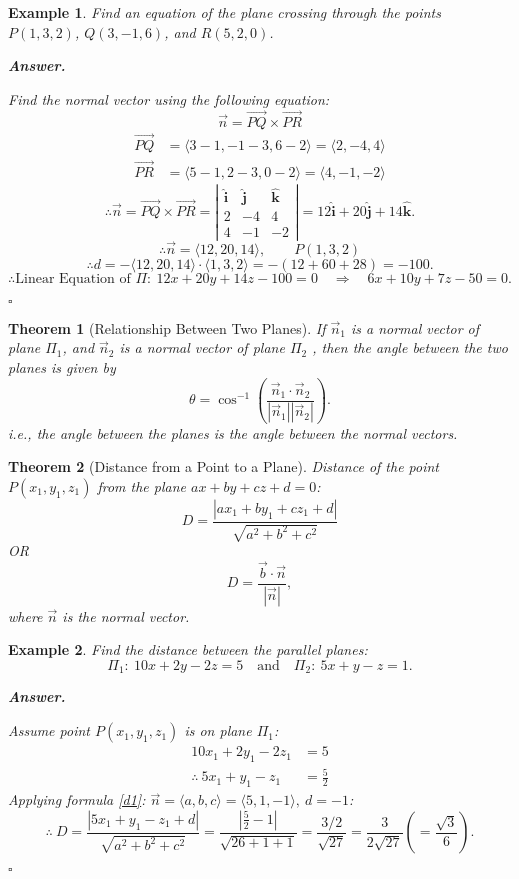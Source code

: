 \documentclass[12pt,a4paper]{article}
\newtheorem{thm}{Theorem}[subsection]
\newtheorem{eg}{Example}[subsection]
\newenvironment*{ans}{\par\indent\textbf{\textit{Answer. }}\par}{\par\hfill{$\square$}\par}
\def\vecb{\vec{b}}
\def\vecn{\vec{n}}
\def\veci{\hat{\boldsymbol{\textbf{i}}}}
\def\vecj{\hat{\boldsymbol{\textbf{j}}}}
\def\veck{\hat{\boldsymbol{\textbf{k}}}}
\begin{document}
\begin{eg}
	Find an equation of the plane crossing through the points $P(1,3,2)$, $Q(3,-1,6)$, and $R(5,2,0)$.
	\begin{ans}
		Find the normal vector using the following equation: \[\vecn=\overrightarrow{PQ}\times\overrightarrow{PR}\]
		\[\begin{aligned}
			\overrightarrow{PQ}&=\langle3-1,-1-3,6-2\rangle=\langle2,-4,4\rangle\\
			\overrightarrow{PR}&=\langle5-1,2-3,0-2\rangle=\langle4,-1,-2\rangle
		\end{aligned}\]
		\[\therefore\vecn=\overrightarrow{PQ}\times\overrightarrow{PR}=\left|\begin{matrix}\veci&\vecj&\veck\\2&-4&4\\4&-1&-2\end{matrix}\right|=12\veci+20\vecj+14\veck.\]
		\[\therefore \vecn=\langle12,20,14\rangle,\qquad P(1,3,2)\]
		\[\therefore d=-\langle12,20,14\rangle\cdot\langle1,3,2\rangle=-(12+60+28)=-100.\]
		\[\therefore \text{Linear Equation of } \Pi:\  12x+20y+14z-100=0\quad\Longrightarrow\quad6x+10y+7z-50=0.\]
	\end{ans}
\end{eg}
\begin{thm}[Relationship Between Two Planes]
	If $\vecn_1$ is a normal vector of plane $\Pi_1$, and $\vecn_2$ is a normal vector of plane $\Pi_2$	, then the angle between the two planes is given by \[\theta=\cos^{-1}\left(\frac{\vecn_1\cdot\vecn_2}{|\vecn_1||\vecn_2|}\right).\]
	i.e., the angle between the planes is the angle between the normal vectors. 
\end{thm}
\begin{thm}[Distance from a Point to a Plane]
	Distance of the point $P(x_1,y_1,z_1)$ from the plane $ax+by+cz+d=0$: 
	\begin{equation}\label{d1}
		D=\frac{|ax_1+by_1+cz_1+d|}{\sqrt{a^2+b^2+c^2}} 	
	\end{equation}
	OR
	\begin{equation}\label{d2}
	D=\frac{\vecb\cdot\vecn}{|\vecn|}, 	
	\end{equation}
	where $\vecn$ is the normal vector. 
\end{thm}
\begin{eg}
	Find the distance between the parallel planes: \[\Pi_1:\ 10x+2y-2z=5\quad\text{and}\quad\Pi_2:\ 5x+y-z=1.\]
	\begin{ans}
		Assume point $P(x_1,y_1,z_1)$ is on plane $\Pi_1$: \[\begin{aligned}10x_1+2y_1-2z_1&=5\\\therefore\ 5x_1+y_1-z_1&=\frac{5}{2}\end{aligned}\]	
		Applying formula \ref{d1}: $\vecn=\langle a,b,c\rangle=\langle5,1,-1\rangle,\ d=-1$: 
		\[\therefore\ D=\frac{|5x_1+y_1-z_1+d|}{\sqrt{a^2+b^2+c^2}}=\frac{|\frac{5}{2}-1|}{\sqrt{26+1+1}}=\frac{3/2}{\sqrt{27}}=\frac{3}{2\sqrt{27}}\left(=\frac{\sqrt{3}}{6}\right).\]
	\end{ans}
\end{eg}
\end{document}
